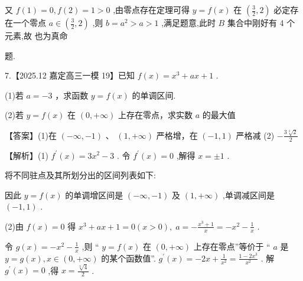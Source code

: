 \documentclass[10pt]{article}
\newcommand*\circled[1]{\tikz[baseline=(char.base)]{\node[shape=circle,draw,inner sep=1.5pt] (char) {\small #1};}}
\begin{document}
又 \(f\left( 1\right)  = 0,f\left( 2\right)  = 1 > 0\) ,由零点存在定理可得 \(y = f\left( x\right)\) 在 \(\left( {\frac{3}{2},2}\right)\) 必定存在一个零点 \(a \in  \left( {\frac{3}{2},2}\right)\) ,则 \(b = {a}^{2} > a > 1\) ,满足题意,此时 \(B\) 集合中刚好有 4 个元素,故 \circled{2} 也为真命

题.

7.【2025.12 嘉定高三一模 19】已知 \(f\left( x\right)  = {x}^{3} + {ax} + 1\) .

(1)若 \(a =  - 3\) ，求函数 \(y = f\left( x\right)\) 的单调区间.

(2)若 \(y = f\left( x\right)\) 在 \(\left( {0, + \infty }\right)\) 上存在零点，求实数 \(a\) 的最大值

【答案】(1)在 \(\left( {-\infty , - 1}\right)\) 、 \(\left( {1, + \infty }\right)\) 严格增，在 \(\left( {-1,1}\right)\) 严格减 (2) \(- \frac{3\sqrt[3]{2}}{2}\)

【解析】(1) \({f}^{\prime }\left( x\right)  = 3{x}^{2} - 3\) . 令 \({f}^{\prime }\left( x\right)  = 0\) ,解得 \(x =  \pm  1\) .

将不同驻点及其所划分出的区间列表如下:

\begin{center}
\end{center}

因此 \(y = f\left( x\right)\) 的单调增区间是 \(\left( {-\infty , - 1}\right)\) 及 \(\left( {1, + \infty }\right)\) ,单调减区间是 \(\left( {-1,1}\right)\) .

(2)由 \(f\left( x\right)  = 0\) 得 \({x}^{3} + {ax} + 1 = 0\left( {x > 0}\right) ,\;a =  - \frac{{x}^{3} + 1}{x} =  - {x}^{2} - \frac{1}{x}\) .

令 \(g\left( x\right)  =  - {x}^{2} - \frac{1}{x}\) ,则 “ \(y = f\left( x\right)\) 在 \(\left( {0, + \infty }\right)\) 上存在零点”等价于 “ \(a\) 是 \(y = g\left( x\right) ,x \in  \left( {0, + \infty }\right)\) 的某个函数值”. \({g}^{\prime }\left( x\right)  =  - {2x} + \frac{1}{{x}^{2}} = \frac{1 - 2{x}^{3}}{{x}^{2}}\) . 解 \({g}^{\prime }\left( x\right)  = 0\) ,得 \(x = \frac{\sqrt[3]{4}}{2}\) .
\end{document}
